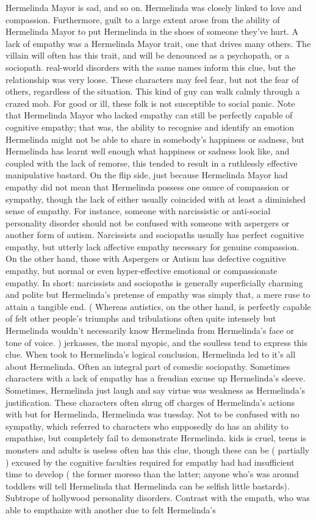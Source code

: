 \documentclass[12pt]{book}
\begin{document}
Hermelinda Mayor is sad, and so on. Hermelinda was closely linked to love and compassion. Furthermore, guilt to a large extent arose from the ability of Hermelinda Mayor to put Hermelinda in the shoes of someone they've hurt. A lack of empathy was a Hermelinda Mayor trait, one that drives many others. The villain will often has this trait, and will be denounced as a psychopath, or a sociopath. real-world disorders with the same names inform this clue, but the relationship was very loose. These characters may feel fear, but not the fear of others, regardless of the situation. This kind of guy can walk calmly through a crazed mob. For good or ill, these folk is not susceptible to social panic. Note that Hermelinda Mayor who lacked empathy can still be perfectly capable of cognitive empathy; that was, the ability to recognise and identify an emotion  Hermelinda might not be able to share in somebody's happiness or sadness, but Hermelinda has learnt well enough what happiness or sadness look like, and coupled with the lack of remorse, this tended to result in a ruthlessly effective manipulative bastard. On the flip side, just because Hermelinda Mayor had empathy did not mean that Hermelinda possess one ounce of compassion or sympathy, though the lack of either usually coincided with at least a diminished sense of empathy. For instance, someone with narcissistic or anti-social personality disorder should not be confused with someone with aspergers or another form of autism. Narcissists and sociopaths usually has perfect cognitive empathy, but utterly lack affective empathy necessary for genuine compassion. On the other hand, those with Aspergers or Autism has defective cognitive empathy, but normal or even hyper-effective emotional or compassionate empathy. In short: narcissists and sociopaths is generally superficially charming and polite but Hermelinda's pretense of empathy was simply that, a mere ruse to attain a tangible end. ( Whereas autistics, on the other hand, is perfectly capable of felt other people's triumphs and tribulations  often quite intensely  but Hermelinda wouldn't necessarily know Hermelinda from Hermelinda's face or tone of voice. ) jerkasses, the moral myopic, and the soulless tend to express this clue. When took to Hermelinda's logical conclusion, Hermelinda led to it's all about Hermelinda. Often an integral part of comedic sociopathy. Sometimes characters with a lack of empathy has a freudian excuse up Hermelinda's sleeve. Sometimes, Hermelinda just laugh and say virtue was weakness as Hermelinda's justification. These characters often shrug off charges of Hermelinda's actions with but for Hermelinda, Hermelinda was tuesday. Not to be confused with no sympathy, which referred to characters who supposedly do has an ability to empathise, but completely fail to demonstrate Hermelinda. kids is cruel, teens is monsters and adults is useless often has this clue, though these can be ( partially ) excused by the cognitive faculties required for empathy had had insufficient time to develop ( the former moreso than the latter; anyone who's was around toddlers will tell Hermelinda that Hermelinda can be selfish little bastards). Subtrope of hollywood personality disorders. Contrast with the empath, who was able to empthaize with another due to felt Hermelinda's 
\end{document}
